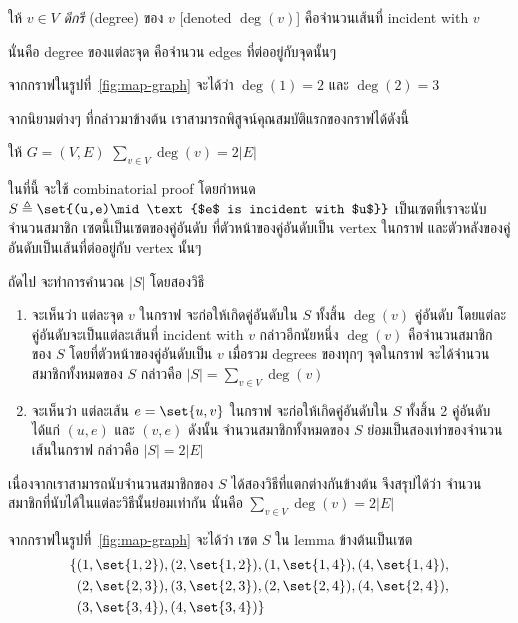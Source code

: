 \begin{definition}
ให้ $v\in V$ \enskip \emph{ดีกรี} (degree) ของ $v$ [denoted $\deg(v)$] คือจำนวนเส้นที่ incident with $v$
\end{definition}
นั่นคือ degree ของแต่ละจุด คือจำนวน edges ที่ต่ออยู่กับจุดนั้นๆ

\begin{example}
จากกราฟในรูปที่~\ref{fig:map-graph} จะได้ว่า $\deg(1)=2$ และ $\deg(2)=3$
\end{example}

จากนิยามต่างๆ ที่กล่าวมาข้างต้น เราสามารถพิสูจน์คุณสมบัติแรกของกราฟได้ดังนี้
\begin{lemma}
ให้ $G=(V,E)$ \enskip $\sum_{v\in V}{\deg(v)}=2|E|$
\begin{pf}
ในที่นี้ จะใช้ combinatorial proof โดยกำหนด $S\triangleq\set{(u,e)\mid\text{$e$ is incident with $u$}}$ เป็นเซตที่เราจะนับจำนวนสมาชิก \enskip เซตนี้เป็นเซตของคู่อันดับ ที่ตัวหน้าของคู่อันดับเป็น vertex ในกราฟ และตัวหลังของคู่อันดับเป็นเส้นที่ต่ออยู่กับ vertex นั้นๆ

ถัดไป จะทำการคำนวณ $|S|$ โดยสองวิธี
\begin{enumerate}
\item จะเห็นว่า แต่ละจุด $v$ ในกราฟ จะก่อให้เกิดคู่อันดับใน $S$ ทั้งสิ้น $\deg(v)$ คู่อันดับ โดยแต่ละคู่อันดับจะเป็นแต่ละเส้นที่ incident with $v$ \enskip กล่าวอีกนัยหนึ่ง $\deg(v)$ คือจำนวนสมาชิกของ $S$ โดยที่ตัวหน้าของคู่อันดับเป็น $v$ \enskip เมื่อรวม degrees ของทุกๆ จุดในกราฟ จะได้จำนวนสมาชิกทั้งหมดของ $S$ กล่าวคือ $|S|=\sum_{v\in V}{\deg(v)}$
\item จะเห็นว่า แต่ละเส้น $e=\set{u,v}$ ในกราฟ จะก่อให้เกิดคู่อันดับใน $S$ ทั้งสิ้น 2 คู่อันดับ ได้แก่ $(u,e)$ และ $(v,e)$ \enskip ดังนั้น จำนวนสมาชิกทั้งหมดของ $S$ ย่อมเป็นสองเท่าของจำนวนเส้นในกราฟ กล่าวคือ $|S|=2|E|$
\end{enumerate}
เนื่องจากเราสามารถนับจำนวนสมาชิกของ $S$ ได้สองวิธีที่แตกต่างกันข้างต้น จึงสรุปได้ว่า จำนวนสมาชิกที่นับได้ในแต่ละวิธีนั้นย่อมเท่ากัน นั่นคือ $\sum_{v\in V}{\deg(v)}=2|E|$
\end{pf}
\end{lemma}
%
\begin{example}
จากกราฟในรูปที่~\ref{fig:map-graph} จะได้ว่า เซต $S$ ใน lemma ข้างต้นเป็นเซต
\begin{align*}
\{
& (1,\set{1,2}),(2,\set{1,2}), (1,\set{1,4}),(4,\set{1,4}), \\
& (2,\set{2,3}),(3,\set{2,3}), (2,\set{2,4}),(4,\set{2,4}), \\
& (3,\set{3,4}),(4,\set{3,4})
\}
\end{align*}
\end{example}

